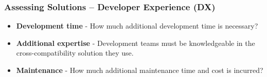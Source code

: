 \begin{frame}
\frametitle{Assessing Solutions – Developer Experience (DX)}
\begin{theorembox}
\begin{itemize}
    \setlength{\itemsep}{8pt}
    \item \textbf{Development time} - How much additional development time is necessary?
    \item \textbf{Additional expertise} - Development teams must be knowledgeable in the cross-compatibility solution they use.
    \item \textbf{Maintenance} - How much additional maintenance time and cost is incurred?
\end{itemize}
\end{theorembox}
\end{frame}